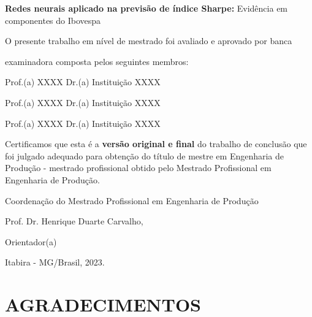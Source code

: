 \documentclass[12pt, a4paper]{article}
\newcommand{\Title}{\textbf{Redes neurais aplicado na previsão de índice Sharpe: }}
\newcommand{\Subtitle}{Evidência em componentes do Ibovespa}
\newcommand{\Location}{Itabira - MG/Brasil}
\newcommand{\Year}{2023}
\newcommand{\Supervisor}{Prof. Dr. Henrique Duarte Carvalho}
\begin{document}
        \Title \Subtitle
        \vspace{1cm}


        O presente trabalho em nível de mestrado foi avaliado e aprovado por banca 
        
        examinadora composta pelos seguintes membros:

        \vspace{1cm}    
        Prof.(a) XXXX Dr.(a)
        Instituição XXXX
        
        \vspace{1cm}    
        Prof.(a) XXXX Dr.(a)
        Instituição XXXX
        
        \vspace{1cm}    
        Prof.(a) XXXX Dr.(a)
        Instituição XXXX
        
        \vspace{1cm}    
        \justifying \noindent \hspace{1.5cm} Certificamos que esta é a \textbf{versão original e final} do trabalho de conclusão que foi julgado adequado para obtenção do título de mestre em Engenharia de Produção - mestrado profissional obtido pelo Mestrado Profissional em Engenharia de Produção.

        \center
        \vspace{3cm}
        \hspace{2cm} \hrulefill \hspace{2cm}

        Coordenação do Mestrado Profissional em Engenharia de Produção

        \vspace{1cm}
        \hspace{2cm} \hrulefill \hspace{2cm}

        \Supervisor,

        Orientador(a)

        \null\vfil
        \Location, \Year.

        \pagebreak

        \null\vfil
        \begin{changemargin}{5cm}{0cm} 
            
        \end{changemargin}
        \pagebreak
    
        \center \fontsize{12}{14} \selectfont \section*{AGRADECIMENTOS}
        \justifying
        \hspace{1.5cm} 
        \pagebreak
\end{document}
